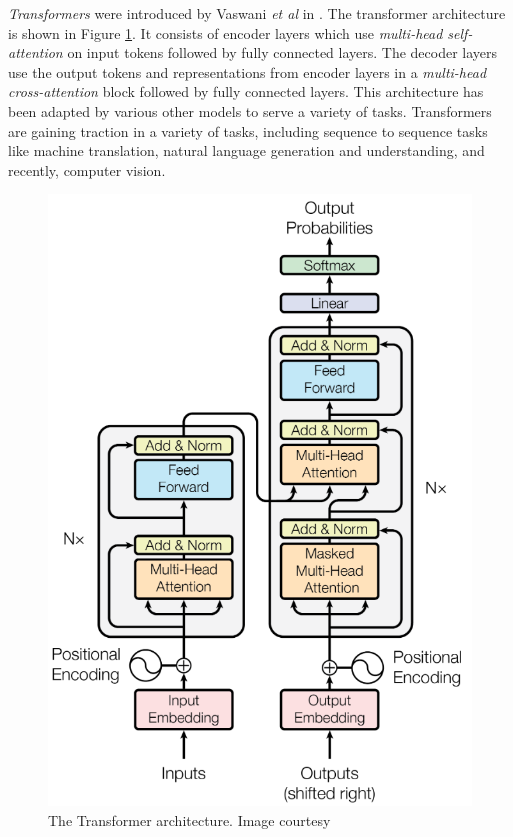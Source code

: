 \par \textit{Transformers} were introduced by Vaswani \textit{et al} in \cite{tfm}. The transformer architecture is shown in Figure \ref{fig:transformer}. It consists of encoder layers which use \textit{multi-head self-attention} on input tokens followed by fully connected layers. The decoder layers use the output tokens and representations from encoder layers in a \textit{multi-head cross-attention} block followed by fully connected layers. This architecture has been adapted by various other models to serve a variety of tasks. Transformers are gaining traction in a variety of tasks, including sequence to sequence tasks like machine translation, natural language generation and understanding, and recently, computer vision.

\begin{figure}[h]
\centering
\includegraphics[width=0.5\linewidth]{assets/img/transformer.png}
\caption{The Transformer architecture. Image courtesy \cite{tfm}}
\label{fig:transformer}
\end{figure}